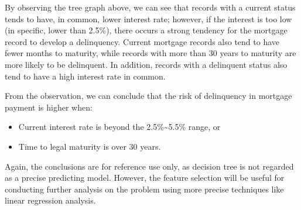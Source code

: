 \documentclass[11pt]{article}
\providecommand{\tightlist}{%
      \setlength{\itemsep}{0pt}\setlength{\parskip}{0pt}}
\begin{document}
    By observing the tree graph above, we can see that records with a
current status tends to have, in common, lower interest rate; however,
if the interest is too low (in specific, lower than 2.5\%), there occurs
a strong tendency for the mortgage record to develop a delinquency.
Current mortgage records also tend to have fewer months to maturity,
while records with more than 30 years to maturity are more likely to be
delinquent. In addition, records with a delinquent status also tend to
have a high interest rate in common.

From the observation, we can conclude that the risk of delinquency in
mortgage payment is higher when:

\begin{itemize}
\tightlist
\item
  Current interest rate is beyond the 2.5\%\textasciitilde5.5\% range,
  or
\item
  Time to legal maturity is over 30 years.
\end{itemize}

Again, the conclusions are for reference use only, as decision tree is
not regarded as a precise predicting model. However, the feature
selection will be useful for conducting further analysis on the problem
using more precise techniques like linear regression analysis.


    
    
    
\end{document}
